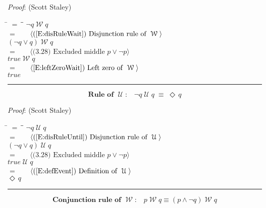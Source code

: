 \documentclass[12pt, fleqn, leqno]{article}
\newcommand{\lgap}{2pt}                             %
\newcommand{\mymathindent}{24pt}                    %
\newcommand{\equivs}{\ensuremath{\;\equiv\;}}       %
\newcommand{\Until}{\;\mathcal{U}\;}
\newcommand{\Wait}{\;\mathcal{W}\;}
\newcommand{\Event}{\Diamond\,}
\newcommand{\myqed}{\rule[-.23ex]{1.2ex}{2.0ex}}
\newcommand{\myqedtab}{\hspace{384pt}}              %
\newcommand{\Gll} {\langle}                         %
\newcommand{\Ggg} {\rangle}                         %
\newcommand{\Hint}[1]     {\ \ \ $\Gll              \mbox{#1} \Ggg$ }   %
\begin{document}
\emph{Proof}: (Scott Staley)
\begin{tabbing}
\hspace{\mymathindent} \= $= \;$ \= \myqedtab \= \kill
\> \> $\neg q\Wait q$\\[\lgap]
\> $=$ \> \Hint{(\ref{E:disRuleWait}) Disjunction rule of $\Wait$} \\[\lgap]
\> \> $(\neg q\lor q)\Wait q$\\[\lgap]
\> $=$ \> \Hint{(3.28) Excluded middle $p\lor \neg p$} \\[\lgap]
\> \> $true\Wait q$\\[\lgap]
\> $=$ \> \Hint{\ref{E:leftZeroWait}) Left zero of $\Wait$} \\[\lgap]
\> \> $true$ \quad \myqed
\end{tabbing}
\begin{equation}\label{E:ruleUntil}
\textbf{Rule of $\Until$:}\quad \neg q \Until q\equivs \Event q
\end{equation}

\emph{Proof}: (Scott Staley)
\begin{tabbing}
\hspace{\mymathindent} \= $= \;$ \= \myqedtab \= \kill
\> \> $\neg q\Until q$\\[\lgap]
\> $=$ \> \Hint{(\ref{E:disRuleUntil}) Disjunction rule of $\Until$} \\[\lgap]
\> \> $(\neg q\lor q)\Until q$\\[\lgap]
\> $=$ \> \Hint{(3.28) Excluded middle $p\lor \neg p$} \\[\lgap]
\> \> $true\Until q$\\[\lgap]
\> $=$ \> \Hint{(\ref{E:defEvent}) Definition of $\Until$} \\[\lgap]
\> \> $\Event q$ \quad \myqed
\end{tabbing}
\begin{equation}\label{E:conRuleWait}
\textbf{Conjunction rule of $\Wait$:}\quad p\Wait q\equiv (p\land \neg q)\Wait q
\end{equation}
\end{document}

